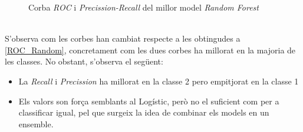 \documentclass[a4paper, 11pt]{article}
\begin{document}
\begin{figure}[h]
\centering
    \caption{Corba \textit{ROC} i \textit{Precission-Recall} del millor model \textit{Random Forest}}
    \label{fig:my_label}
\end{figure}\\
S'observa com les corbes han cambiat respecte a les obtingudes a \textcolor{blue}{\ref{ROC_Random}}, concretament com les dues corbes ha millorat en la majoria de les classes.
No obstant, s'observa el següent:
\begin{itemize}
    \item La \textit{Recall} i \textit{Precission} ha millorat en la classe 2 pero empitjorat en la classe 1
    \item Els valors son força semblants al Logístic, però no el suficient com per a classificar igual, pel que surgeix la idea de combinar els models en un ensemble. 
\end{itemize}
\newpage
\end{document}
